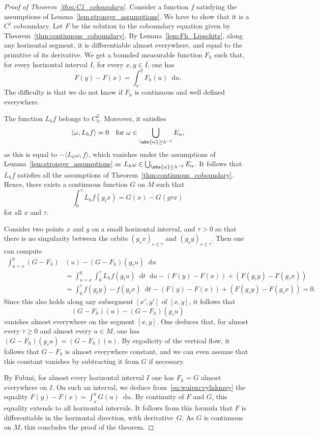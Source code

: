 \documentclass[10pt]{amsart}
\newcommand{\dd}{\mathop{}\!\mathrm{d}}
\theoremstyle{definition}
\numberwithin{equation}{section}
\begin{document}
\begin{proof}[Proof of Theorem~\ref{thm:C1_coboundary}]
Consider a function $f$ satisfying the assumptions of
Lem\-ma~\ref{lem:stronger_assumptions}. We have to show that it is a $C^1$
coboundary. Let $F$ be the solution to the coboundary equation given by
Theorem~\ref{thm:continuous_coboundary}. By Lemma~\ref{lem:Fh_Lipschitz},
along any horizontal segment, it is differentiable almost everywhere, and
equal to the primitive of its derivative. We get a bounded measurable
function $F_h$ such that, for every horizontal interval $I$, for every $x,
y\in I$, one has
\begin{equation}
\label{eq:wuipxcvylnkmuy}
F(y)-F(x) = \int_x^y F_h(u) \dd u.
\end{equation}
The difficulty is that we do not know if $F_h$ is continuous and well defined
everywhere.

The function $L_h f$ belongs to $C^2_h$. Moreover, it satisfies
\[
\langle
\omega, L_h f\rangle = 0\quad\text{for }\omega \in \bigcup_{\abs{\alpha} \geq
\lambda^{-1}} E_\alpha,
\]
as this is equal to $-\langle L_h \omega, f\rangle$,
which vanishes under the assumptions of Lemma~\ref{lem:stronger_assumptions}
as $L_h \omega \in \bigcup_{\abs{\alpha} \geq \lambda^{-2}} E_\alpha$. It
follows that $L_h f$ satisfies all the assumptions of
Theorem~\ref{thm:continuous_coboundary}. Hence, there exists a continuous
function $G$ on $M$ such that
\[
\int_0^\tau L_h f(g_t x) = G(x)-G(g\tau x)
\]
for all $x$ and $\tau$.

Consider two points $x$ and $y$ on a small horizontal interval, and $\tau>0$
so that there is no singularity between the orbits $(g_s x)_{s\leq \tau}$ and
$(g_s y)_{s\leq \tau}$. Then one can compute
\begin{align*}
\int_{u=x}^y (G-F_h)&(u) - (G-F_h)(g_\tau u) \dd u
\\[-5pt]
&= \int_{u=x}^y \int_0^\tau L_h f(g_t u) \dd t \dd u - (F(y)-F(x)) + (F(g_\tau y) - F(g_\tau x))
\\& = \int_0^\tau f(g_t y) - f(g_t x) \dd t - (F(y)-F(x)) + (F(g_\tau y) - F(g_\tau x))
= 0.
\end{align*}
Since this also holds along any subsegment $[x',y']$ of $[x,y]$, it follows
that
\[
(G-F_h)(u) - (G-F_h)(g_\tau u)
\]
vanishes almost everywhere on the
segment $[x,y]$. One deduces that, for almost every $\tau \geq 0$ and almost
every $u\in M$, one has $(G-F_h)(g_\tau u) = (G-F_h)(u)$. By ergodicity of
the vertical flow, it follows that $G-F_h$ is almost everywhere constant, and
we can even assume that this constant vanishes by subtracting it from $G$ if
necessary.

By Fubini, for almost every horizontal interval $I$ one has $F_h = G$ almost
everywhere on $I$. On such an interval, we deduce
from~\eqref{eq:wuipxcvylnkmuy} the equality $F(y)-F(x) = \int_x^y G(u) \dd
u$. By continuity of $F$ and $G$, this equality extends to all horizontal
intervals. It follows from this formula that $F$ is differentiable in the
horizontal direction, with derivative~$G$. As $G$ is continuous on $M$, this
concludes the proof of the theorem.
\end{proof}
\end{document}
